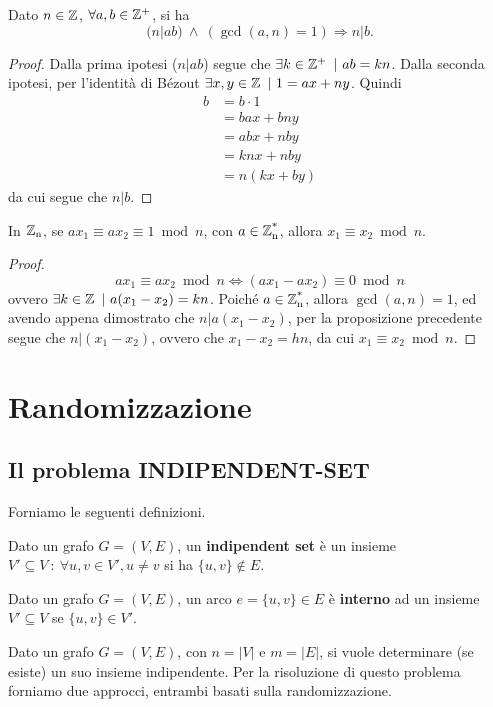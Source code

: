 \begin{proposizione}
Dato $n\in \operatorname*{\mathbb{Z}}$, $\forall a,b\in \operatorname*{\mathbb{Z}^+}$, si ha
\[
(n|ab)\ \land\ (\gcd(a,n)=1) \Rightarrow n|b.
\]
\end{proposizione}
\begin{proof}
Dalla prima ipotesi ($n|ab$) segue che $\exists k\in \operatorname*{\mathbb{Z}^+}\ |\ ab=kn$. Dalla seconda ipotesi, per l'identità di Bézout $\exists x,y\in\operatorname*{\mathbb{Z}}\ |\ 1=ax+ny$. Quindi
\begin{align*}
b&=b\cdot 1 \\
&=bax+bny \\
&=abx+nby \\
&=knx+nby \\
&=n(kx+by)
\end{align*}
da cui segue che $n|b$.
\end{proof}

\begin{proposizione}
In $\operatorname*{\mathbb{Z}_n}$, se $ax_1\equiv ax_2\equiv 1\bmod n$, con $a\in\operatorname*{\mathbb{Z}_n^*}$, allora $x_1\equiv x_2\bmod n$.
\end{proposizione}
\begin{proof}
\[
ax_1\equiv ax_2\bmod n \Leftrightarrow (ax_1-ax_2)\equiv 0\bmod n
\]
ovvero $\exists k\in\Z\ |\ a(x_1-x_2)=kn$. Poiché $a\in\operatorname*{\mathbb{Z}_n^*}$, allora $\gcd(a,n)=1$, ed avendo appena dimostrato che $n|a(x_1-x_2)$, per la proposizione precedente segue che $n|(x_1-x_2)$, ovvero che $x_1-x_2=hn$, da cui $x_1\equiv x_2\bmod n$.
\end{proof}

\section{Randomizzazione}
\subsection{Il problema INDIPENDENT-SET}
Forniamo le seguenti definizioni.
\begin{definizione}
Dato un grafo $G=(V,E)$, un \textbf{indipendent set} è un insieme $V'\subseteq V\ :\ \forall u,v\in V',u\neq v$ si ha $\{u,v\}\notin E$.
\end{definizione}
\begin{definizione}
Dato un grafo $G=(V,E)$, un arco $e=\{u,v\}\in E$ è \textbf{interno} ad un insieme $V'\subseteq V$ se $\{u,v\}\in V'$.
\end{definizione}

Dato un grafo $G=(V,E)$, con $n=|V|$ e $m=|E|$, si vuole determinare (se esiste) un suo insieme indipendente. Per la risoluzione di questo problema forniamo due approcci, entrambi basati sulla randomizzazione.

